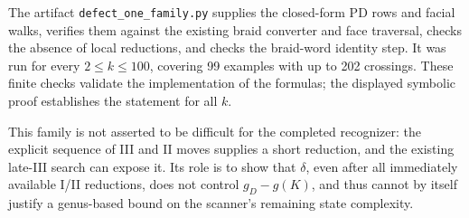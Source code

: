 The artifact \texttt{defect\_one\_family.py} supplies the closed-form
PD rows and facial walks, verifies them against the existing braid
converter and face traversal, checks the absence of local reductions,
and checks the braid-word identity step.  It was run for every
$2\le k\le100$, covering 99 examples with up to 202 crossings.
These finite checks validate the implementation of the formulas;
the displayed symbolic proof establishes the statement for all $k$.

This family is not asserted to be difficult for the completed
recognizer: the explicit sequence of III and II moves supplies a
short reduction, and the existing late-III search can expose it.
Its role is to show that $\delta$, even after all immediately
available I/II reductions, does not control $g_D-g(K)$, and thus
cannot by itself justify a genus-based bound on the scanner's
remaining state complexity.
